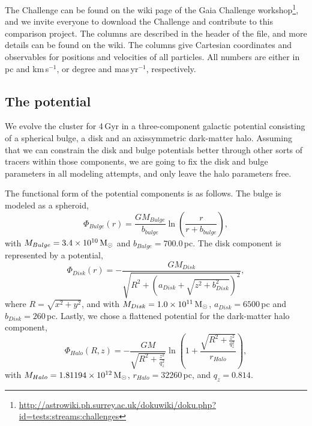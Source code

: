 The Challenge can be found on the wiki page of the Gaia Challenge workshop\footnote{\url{http://astrowiki.ph.surrey.ac.uk/dokuwiki/doku.php?id=tests:streams:challenges}}, and we invite everyone to download the Challenge and contribute to this comparison project. The columns are described in the header of the file, and more details can be found on the wiki. The columns give Cartesian coordinates and observables for positions and velocities of all particles. All numbers are either in pc and km\,s$^{-1}$, or degree and mas\,yr$^{-1}$, respectively. 



\subsection{The potential}\label{ssec:potential}

We evolve the cluster for 4\,Gyr in a three-component galactic potential consisting of a spherical bulge, a disk and an axissymmetric dark-matter halo. Assuming that we can constrain the disk and bulge potentials better through other sorts of tracers within those components, we are going to fix the disk and bulge parameters in all modeling attempts, and only leave the halo parameters free. 

The functional form of the potential components is as follows. The bulge is modeled as a \citet{Jaffe83} spheroid, 
\begin{equation}
  \Phi_{Bulge}(r) = \frac{GM_{Bulge}}{b_{bulge}}\ln\left(\frac{r}{r+b_{bulge}}\right),
\end{equation}
with $M_{Bulge} = 3.4\times 10^{10}\mbox{$\,{\rm M}_\odot$}$ and $b_{Bulge} = 700.0$\,pc. The disk component is represented by a \citet{Miyamoto75} potential,
\begin{equation}
  \Phi_{Disk}(r) = -\frac{GM_{Disk}}{\sqrt{R^2+\left(a_{Disk}+\sqrt{z^2+b_{Disk}^2}\right)^2}},
\end{equation}
where $R = \sqrt{x^2+y^2}$, and with $M_{Disk} = 1.0\times 10^{11}\mbox{$\,{\rm M}_\odot$}$, $a_{Disk} = 6500$\,pc and $b_{Disk} = 260$\,pc. Lastly, we chose a flattened \citet{Navarro97} potential for the dark-matter halo component, 
\begin{equation}
  \Phi_{Halo}(R, z) = -\frac{GM}{\sqrt{R^2+\frac{z^2}{q_z^2}}}\ln\left(1+\frac{\sqrt{R^2+\frac{z^2}{q_z^2}}}{r_{Halo}} \right),
\end{equation}
with $M_{Halo} = 1.81194\times 10^{12}\mbox{$\,{\rm M}_\odot$}$, $r_{Halo} = 32260$\,pc, and $q_z = 0.814$.

